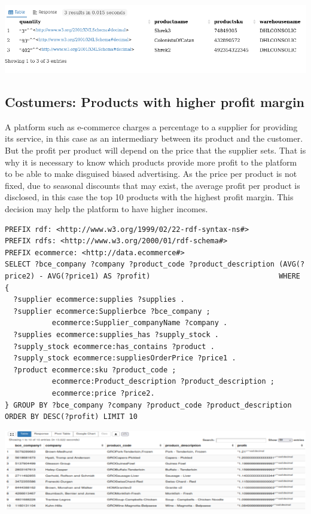 \documentclass{article}
\begin{document}
\begin{center}
   \includegraphics[scale=0.5]{OISreport-warehouse-query.png}
\end{center}



\subsection{Costumers: Products with higher profit margin}
A platform such as e-commerce charges a percentage to a supplier for providing its service, in this case as an intermediary between its product and the customer. But the profit per product will depend on the price that the supplier sets. That is why it is necessary to know which products provide more profit to the platform to be able to make disguised biased advertising. As the price per product is not fixed, due to seasonal discounts that may exist, the average profit per product is disclosed, in this case the top 10 products with the highest profit margin. This decision may help the platform to have higher incomes. \\

\begin{lstlisting}[breaklines, frame=single]
PREFIX rdf: <http://www.w3.org/1999/02/22-rdf-syntax-ns#>
PREFIX rdfs: <http://www.w3.org/2000/01/rdf-schema#>
PREFIX ecommerce: <http://data.ecommerce#>
SELECT ?bce_company ?company ?product_code ?product_description (AVG(?price2) - AVG(?price1) AS ?profit)                              WHERE {
  ?supplier ecommerce:supplies ?supplies .
  ?supplier ecommerce:Supplierbce ?bce_company ;
           ecommerce:Supplier_companyName ?company .
  ?supplies ecommerce:supplies_has ?supply_stock .
  ?supply_stock ecommerce:has_contains ?product .
  ?supply_stock ecommerce:suppliesOrderPrice ?price1 .
  ?product ecommerce:sku ?product_code ;
           ecommerce:Product_description ?product_description ;
           ecommerce:price ?price2.
} GROUP BY ?bce_company ?company ?product_code ?product_description ORDER BY DESC(?profit) LIMIT 10
\end{lstlisting}

\begin{center}
   \includegraphics[scale=0.25]{OISreport-costumer-query.png}
\end{center}
\end{document}
